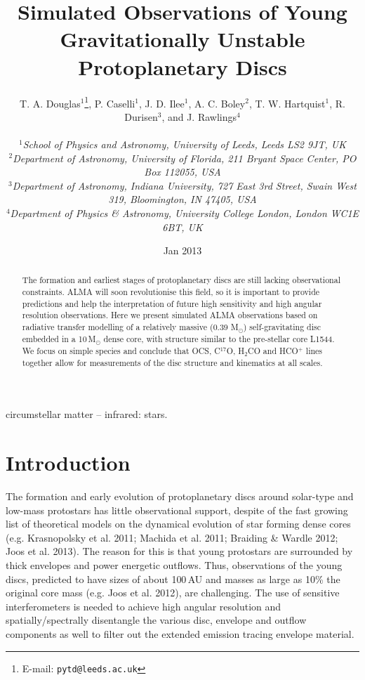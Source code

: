 \documentclass[useAMS,usenatbib]{mn2e}
\title[Young protoplanetary discs]{Simulated Observations of Young Gravitationally Unstable Protoplanetary Discs}
\author[T.~A.~Douglas et al.]
{\parbox{\textwidth}{T. A. Douglas$^{1}$\thanks{E-mail: \texttt{pytd@leeds.ac.uk}},
P. Caselli$^{1}$,
J. D. Ilee$^{1}$,
A. C. Boley$^{2}$,
T. W. Hartquist$^{1}$,
R. Durisen$^{3}$, and
J. Rawlings$^{4}$\\
\vspace{0.1cm}\\
{\small{\it$^{1}$School of Physics and Astronomy, University of Leeds, Leeds LS2 9JT, UK}} \\
{\small{\it$^{2}$Department of Astronomy, University of Florida, 211 Bryant Space Center, PO Box 112055, USA}}\\
{\small{\it$^{3}$Department of Astronomy, Indiana University, 727 East 3rd Street, Swain West 319, Bloomington, IN 47405, USA}}\\
{\small{\it$^{4}$Department of Physics \& Astronomy, University College London, London WC1E 6BT, UK}}\\}}
\begin{document}
\date{Jan 2013}

\pagerange{\pageref{firstpage}--\pageref{lastpage}} 

\maketitle

\label{firstpage}

\begin{abstract}
The formation and earliest stages of protoplanetary discs are still lacking observational constraints. ALMA will soon revolutionise this field, so it is important to provide predictions and help the interpretation of future high sensitivity and high angular resolution observations. Here we present simulated ALMA observations based on radiative transfer modelling of a relatively massive (0.39 M$_{\odot}$) self-gravitating disc embedded in a 10\,M$_{\odot}$ dense core, with structure similar to the pre-stellar core L1544. We focus on simple species and conclude that OCS, C$^{17}$O, H$_2$CO and HCO$^+$ lines together allow for measurements of the disc structure and kinematics at all scales. 
\end{abstract}

\begin{keywords}
circumstellar matter -- infrared: stars.
\end{keywords}

\section{Introduction}

The formation and early evolution of protoplanetary discs around solar-type and low-mass protostars has little observational support, despite of the fast growing list of theoretical models on the dynamical evolution of star forming dense cores (e.g. Krasnopolsky et al. 2011; Machida et al. 2011; Braiding \& Wardle 2012; Joos et al. 2013). The reason for this is that young protostars are surrounded by thick envelopes and power energetic outflows. Thus, observations of the young discs, predicted to have sizes of about 100\,AU and masses as large as 10\% the original core mass (e.g. Joos et al. 2012), are challenging. The use of sensitive interferometers is needed to achieve high angular resolution and spatially/spectrally disentangle the various disc, envelope and outflow components as well to filter out the extended emission tracing envelope material. \newline
\end{document}
